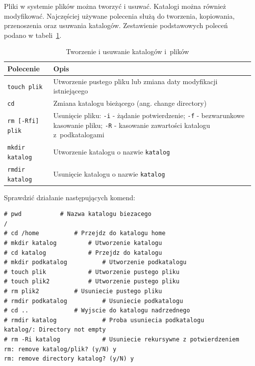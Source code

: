 \begin{example}

Pliki w systemie plików można tworzyć i usuwać. Katalogi można również modyfikować. Najczęściej używane polecenia służą do tworzenia, kopiowania, przenoszenia oraz usuwania katalogów. Zestawienie podstawowych poleceń podano w tabeli~\ref{tab:tworziusun}.

\begin{table}[h!]
\centering
\caption{Tworzenie i usuwanie katalogów i~plików}
\setlength{\arrayrulewidth}{1pt}
\setlength{\tabcolsep}{6pt}
\renewcommand{\arraystretch}{1.2}
\begin{tabular}{ |p{}|p{}|}
\hline \rowcolor{gray}
\textbf{Polecenie} & \textbf{Opis} \\ \hline
\mbox{\lstinline[style=MyBashStyle]{touch plik}} & Utworzenie pustego pliku lub zmiana daty modyfikacji istniejącego \\ \hline
\mbox{\lstinline[style=MyBashStyle]{cd}}  & Zmiana katalogu bieżącego (ang. change directory) \\ \hline
\mbox{\lstinline[style=MyBashStyle]{rm [-Rfi] plik}} & Usunięcie pliku: \mbox{\lstinline[style=MyBashStyle]{-i}} - żądanie potwierdzenie; \mbox{\lstinline[style=MyBashStyle]{-f}} - bezwarunkowe kasowanie pliku; \mbox{\lstinline[style=MyBashStyle]{-R}} - kasowanie zawartości katalogu z~podkatalogami  \\ \hline
\mbox{\lstinline[style=MyBashStyle]{mkdir katalog}} & Utworzenie katalogu o nazwie \mbox{\lstinline[style=MyBashStyle]{katalog}} \\ \hline
\mbox{\lstinline[style=MyBashStyle]{rmdir katalog}} &	Usunięcie katalogu o nazwie \mbox{\lstinline[style=MyBashStyle]{katalog}}  \\ \hline
\end{tabular}
\label{tab:tworziusun}
\end{table}

Sprawdzić działanie następujących komend:

\begin{lstlisting}[style=MyBashStyle]
# pwd			# Nazwa katalogu biezacego
/
# cd /home			# Przejdz do katalogu home
# mkdir katalog			# Utworzenie katalogu
# cd katalog			# Przejdz do katalogu
# mkdir podkatalog			# Utworzenie podkatalogu
# touch plik			# Utworzenie pustego pliku
# touch plik2			# Utworzenie pustego pliku
# rm plik2			# Usuniecie pustego pliku
# rmdir podkatalog			# Usuniecie podkatalogu
# cd .. 			# Wyjscie do katalogu nadrzednego
# rmdir katalog 			# Proba usuniecia podkatalogu
katalog/: Directory not empty
# rm -Ri katalog			# Usuniecie rekursywne z potwierdzeniem
rm: remove katalog/plik? (y/N) y
rm: remove directory katalog? (y/N) y
\end{lstlisting}

\end{example}


